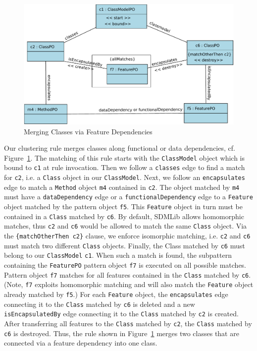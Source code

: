 \documentclass[submission,copyright,creativecommons]{eptcs}
\begin{document}
 
\begin{figure}[ht] \centering
	\includegraphics[width=\linewidth]{images/RuleMergeDep.pdf}
 \caption{Merging Classes via Feature Dependencies}
 \label{fig:MergeAttributeRule}
\end{figure}  

Our clustering rule merges classes along functional or data dependencies, 
cf. Figure~\ref{fig:MergeAttributeRule}. The matching of this rule starts with the \texttt{ClassModel} object which 
is bound to \texttt{c1} at rule invocation. Then we follow a \texttt{classes}
 edge to find a match for \texttt{c2}, i.e. a \texttt{Class} object in our 
\texttt{ClassModel}. Next, we follow an \texttt{encapsulates} edge to match 
a \texttt{Method} object \texttt{m4} contained in \texttt{c2}. The object 
matched by \texttt{m4} must have a \texttt{dataDependency} edge 
or a \texttt{functionalDependency} edge to a \texttt{Feature} object 
matched by the pattern object \texttt{f5}. This 
\texttt{Feature} object in turn must be contained in a \texttt{Class} matched by 
\texttt{c6}. By default, SDMLib allows homomorphic matches, thus \texttt{c2} 
and \texttt{c6} would be allowed to match the same \texttt{Class} object. 
Via the \texttt{\{matchOtherThen c2\}} clause, we enforce isomorphic 
matching, i.e. \texttt{c2} and \texttt{c6} must match two different 
\texttt{Class} objects. Finally, the Class matched by \texttt{c6} must belong to our 
\texttt{ClassModel} \texttt{c1}. When such a match is found, the subpattern 
containing the \texttt{FeaturePO} pattern object \texttt{f7} is executed on 
all possible matches. Pattern object \texttt{f7} matches for all features 
contained in the \texttt{Class} matched by \texttt{c6}. (Note, \texttt{f7} 
exploits homomorphic matching and will also match the \texttt{Feature} 
object already matched by \texttt{f5}.) For each \texttt{Feature} object, 
the \texttt{encapsulates} edge connecting it to the \texttt{Class} matched 
by \texttt{c6} is deleted and a new \texttt{isEncapsulatedBy} edge 
connecting it to the \texttt{Class} matched by \texttt{c2} is created. After 
transferring all features to the \texttt{Class} matched by \texttt{c2}, the 
\texttt{Class} matched by \texttt{c6} is destroyed. Thus, the rule shown in 
Figure~\ref{fig:MergeAttributeRule} merges two classes that are connected 
via a feature dependency into one class. 
\end{document}
